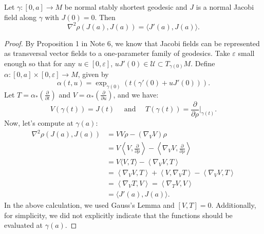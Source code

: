 \documentclass{ctexart}
\begin{document}
\begin{lemma}
  Let $\gamma:[0,a]\rightarrow M$ be normal stably shortest geodesic and $J$ is a normal Jacobi field along $\gamma$ with $J(0)=0$. Then 
  $$
  \nabla^2\rho\left(J\left(a\right),J\left(a\right)\right) = \langle J'\left(a\right),J\left(a\right)\rangle. 
  $$
\end{lemma}
\begin{proof}[Proof]
  By Proposition 1 in Note 6, we know that Jacobi fields can be represented as transversal vector fields to a one-parameter family of geodesics. 
  Take $\varepsilon$ small enough so that for any $u\in [0,\varepsilon]$, $u J'(0)\in \mathcal{U}\subset T_{\gamma(0)} M$. 
  Define $\alpha : [0, a] \times [0, \varepsilon] \rightarrow M$, given by
  $$
  \alpha(t, u) =\exp_{\gamma(0)}\left(t\left(\gamma'(0)+uJ'(0)\right)\right).
  $$
  Let $T = \alpha_*\left(\frac{\partial}{\partial t}\right)$ and $V = \alpha_*\left(\frac{\partial}{\partial u}\right)$, and we have:
  $$
  V(\gamma(t)) = J(t) \quad \text{ and } \quad T(\gamma(t)) = \frac{\partial}{\partial \rho}\big|_{\gamma(t)}.
  $$
  Now, let's compute at $\gamma(a)$: 
  $$
  \begin{aligned}
  \nabla^2 \rho(J(a), J(a)) &= V V \rho - \left(\nabla_V V\right) \rho \\
  &= V\left\langle V, \frac{\partial}{\partial \rho}\right\rangle - \left\langle\nabla_V V, \frac{\partial}{\partial \rho}\right\rangle \\
  &= V\langle V, T\rangle - \left\langle\nabla_V V, T\right\rangle \\
  &= \left\langle\nabla_V V, T\right\rangle + \left\langle V, \nabla_V T\right\rangle - \left\langle\nabla_V V, T\right\rangle \\
  &= \left\langle\nabla_V T, V\right\rangle = \left\langle\nabla_T V, V\right\rangle  \\
  &= \langle J'(a), J(a)\rangle.
  \end{aligned}
  $$
  In the above calculation, we used Gauss's Lemma and $ [V, T] = 0$. Additionally, for simplicity, we did not explicitly indicate that the functions should be evaluated at $\gamma(a)$.
\end{proof}
\end{document}
